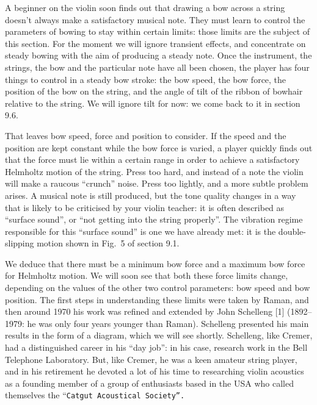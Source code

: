 

  A beginner on the violin soon finds out that drawing a bow across a string 
  doesn’t always make a satisfactory musical note. They must learn to control 
  the parameters of bowing to stay within certain limits: those limits are the 
  subject of this section. For the moment we will ignore transient effects, and 
  concentrate on steady bowing with the aim of producing a steady note. Once 
  the instrument, the strings, the bow and the particular note have all been 
  chosen, the player has four things to control in a steady bow stroke: the bow 
  speed, the bow force, the position of the bow on the string, and the angle of 
  tilt of the ribbon of bowhair relative to the string. We will ignore tilt for 
  now: we come back to it in section 9.6. 

  That leaves bow speed, force and position to consider. If the speed and the 
  position are kept constant while the bow force is varied, a player quickly 
  finds out that the force must lie within a certain range in order to achieve 
  a satisfactory Helmholtz motion of the string. Press too hard, and instead of 
  a note the violin will make a raucous “crunch” noise. Press too lightly, and 
  a more subtle problem arises. A musical note is still produced, but the tone 
  quality changes in a way that is likely to be criticised by your violin 
  teacher: it is often described as “surface sound”, or “not getting into the 
  string properly”. The vibration regime responsible for this “surface sound” 
  is one we have already met: it is the double-slipping motion shown in Fig.\ 5 
  of section 9.1. 

  We deduce that there must be a minimum bow force and a maximum bow force for 
  Helmholtz motion. We will soon see that both these force limits change, 
  depending on the values of the other two control parameters: bow speed and 
  bow position. The first steps in understanding these limits were taken by 
  Raman, and then around 1970 his work was refined and extended by John 
  Schelleng [1] (1892--1979: he was only four years younger than Raman). 
  Schelleng presented his main results in the form of a diagram, which we will 
  see shortly. Schelleng, like Cremer, had a distinguished career in his “day 
  job”: in his case, research work in the Bell Telephone Laboratory. But, like 
  Cremer, he was a keen amateur string player, and in his retirement he devoted 
  a lot of his time to researching violin acoustics as a founding member of a 
  group of enthusiasts based in the USA who called themselves the “\tt{}Catgut 
  Acoustical Societ\rm{}\tt{}y\rm{}”. 

